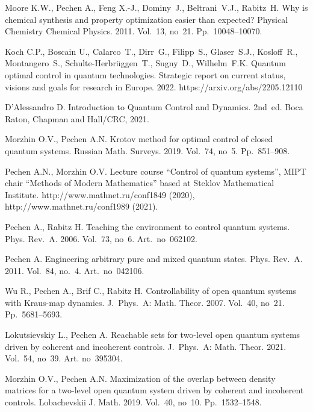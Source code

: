 \documentclass[12pt]{llncs}
\begin{document}
\begin{thebibliography}{99}   

Moore K.W., Pechen A., Feng X.-J., Dominy~J., Beltrani~V.J., Rabitz~H. 
Why is chemical synthesis and property optimization easier than expected? 
Physical Chemistry Chemical Physics. 2011. Vol.~13, no~21. Pp.~10048--10070.

Koch C.P., Boscain U., Calarco~T., 
Dirr~G., Filipp~S., Glaser~S.J., Kosloff~R., Montangero~S., 
Schulte-Herbr\"{u}ggen~T., Sugny~D., Wilhelm~F.K. Quantum optimal control in quantum technologies. Strategic report on current status, visions and goals for research in Europe. 
2022. https://arxiv.org/abs/2205.12110

D'Alessandro D. Introduction to Quantum Control and Dynamics. 2nd~ed. Boca Raton, Chapman and Hall/CRC, 2021.

Morzhin O.V., Pechen A.N. Krotov method for optimal control of closed quantum systems. Russian Math. Surveys. 2019. Vol.~74, no~5. Pp.~851--908.

Pechen A.N., Morzhin O.V. Lecture course ``Control of quantum systems'',
MIPT chair ``Methods of Modern Mathematics'' based at Steklov Mathematical Institute.  
http://www.mathnet.ru/conf1849 (2020), http://www.mathnet.ru/conf1989 (2021).
 
Pechen A., Rabitz H. Teaching the environment to control quantum 
systems. Phys. Rev.~A. 2006. Vol.~73, no~6. Art.~no~062102.  

Pechen A. Engineering arbitrary pure and mixed quantum 
states. Phys. Rev.~A. 2011. Vol.~84, no.~4. Art.~no~042106. 

Wu R., Pechen A., Brif C., Rabitz H. Controllability of open quantum systems 
with Kraus-map dynamics. J.~Phys.~A: Math. Theor.  2007. Vol.~40, no~21. Pp.~5681--5693.

Lokutsievskiy L., Pechen A. Reachable sets for two-level open quantum systems 
driven by coherent and incoherent controls. J.~Phys.~A: Math. Theor. 
2021. Vol.~54, no~39. Art. no~395304.

Morzhin O.V., Pechen A.N. Maximization of the overlap between 
density matrices for a two-level open quantum system driven 
by coherent and incoherent controls. Lobachevskii J. Math. 2019. Vol.~40, no~10.  Pp.~1532--1548.


\end{thebibliography}
\end{document}
